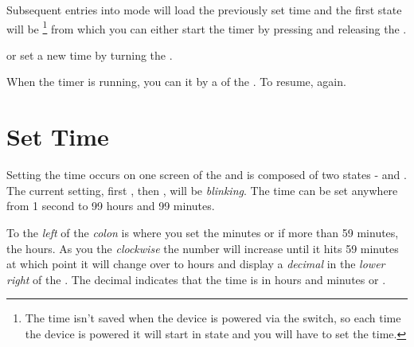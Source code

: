 
Subsequent entries into  mode will load the previously set time and the
first state will be \footnote{ The time isn't saved when the device is
powered  via the  switch, so each time the device is powered
 it will start in  state and you will have to set the time.}
from which you can either start the timer by pressing and releasing the .


or set a new time by turning the .


When the timer is running, you can  it by a  of the .
To resume,  again.


\section{Set Time}

Setting the time occurs on one screen of the  and is composed of two
states -  and . The current setting, first , then
, will be \textit{blinking}.  The time can be set anywhere from \num{1}
second to \num{99} hours and \num{99} minutes.


To the \textit{left} of the \textit{colon} is where you set the minutes or if
more than \num{59} minutes, the hours.  As you  the 
\textit{clockwise} the number will increase until it hits \num{59} minutes at
which point it will change over to hours and display a \textit{decimal} in the
\textit{lower right} of the .  The decimal indicates that the time is in
hours and minutes or .

